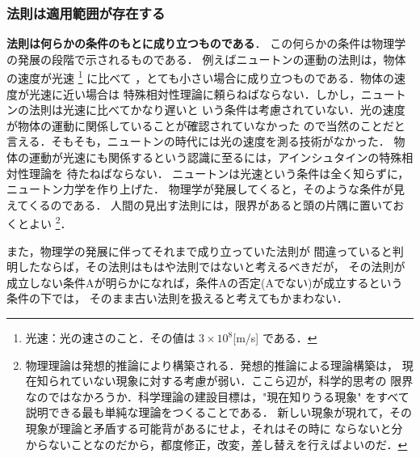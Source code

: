             \subsubsection{法則は適用範囲が存在する}
            \textbf{法則は何らかの条件のもとに成り立つものである}．
            この何らかの条件は物理学の発展の段階で示されるものである．
            例えばニュートンの運動の法則は，物体の速度が光速
                \footnote{
                    光速：光の速さのこと．その値は $3\times10^{8}$[m/s] である．
                }
            に比べて
            ，とても小さい場合に成り立つものである．物体の速度が光速に近い場合は
            特殊相対性理論に頼らねばならない．しかし，ニュートンの法則は光速に比べてかなり遅いと
            いう条件は考慮されていない．光の速度が物体の運動に関係していることが確認されていなかった
            ので当然のことだと言える．そもそも，ニュートンの時代には光の速度を測る技術がなかった．
            物体の運動が光速にも関係するという認識に至るには，アインシュタインの特殊相対性理論を
            待たねばならない．
            ニュートンは光速という条件は全く知らずに，ニュートン力学を作り上げた．
            物理学が発展してくると，そのような条件が見えてくるのである．
            人間の見出す法則には，限界があると頭の片隅に置いておくとよい
                \footnote{
                    物理理論は発想的推論により構築される．発想的推論による理論構築は，
                    現在知られていない現象に対する考慮が弱い．ここら辺が，科学的思考の
                    限界なのではなかろうか．科学理論の建設目標は，"現在知りうる現象"
                    をすべて説明できる最も単純な理論をつくることである．
                    新しい現象が現れて，その現象が理論と矛盾する可能背があるにせよ，それはその時に
                    ならないと分からないことなのだから，都度修正，改変，差し替えを行えばよいのだ．
                }．

            また，物理学の発展に伴ってそれまで成り立っていた法則が
            間違っていると判明したならば，その法則はもはや法則ではないと考えるべきだが，
            その法則が成立しない条件Aが明らかになれば，条件Aの否定(Aでない)が成立するという条件の下では，
            そのまま古い法則を扱えると考えてもかまわない．

